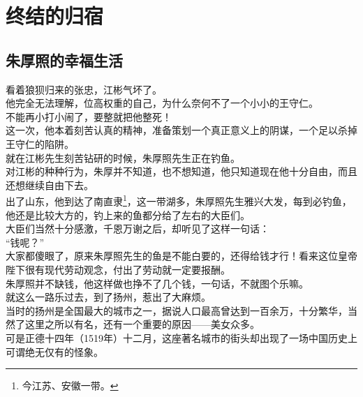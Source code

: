\section{终结的归宿}
\ifnum{}
	\begin{multicols}{\theparacolNo}
\fi
\subsection{朱厚照的幸福生活}
看着狼狈归来的张忠，江彬气坏了。\\

他完全无法理解，位高权重的自己，为什么奈何不了一个小小的王守仁。\\

不能再小打小闹了，要整就把他整死！\\

这一次，他本着刻苦认真的精神，准备策划一个真正意义上的阴谋，一个足以杀掉王守仁的陷阱。\\

就在江彬先生刻苦钻研的时候，朱厚照先生正在钓鱼。\\

对江彬的种种行为，朱厚并不知道，也不想知道，他只知道现在他十分自由，而且还想继续自由下去。\\

出了山东，他到达了南直隶\footnote{今江苏、安徽一带。}，这一带湖多，朱厚照先生雅兴大发，每到必钓鱼，他还是比较大方的，钓上来的鱼都分给了左右的大臣们。\\

大臣们当然十分感激，千恩万谢之后，却听见了这样一句话：\\

“钱呢？”\\

大家都傻眼了，原来朱厚照先生的鱼是不能白要的，还得给钱才行！看来这位皇帝陛下很有现代劳动观念，付出了劳动就一定要报酬。\\

朱厚照并不缺钱，他这样做也挣不了几个钱，一句话，不就图个乐嘛。\\

就这么一路乐过去，到了扬州，惹出了大麻烦。\\

当时的扬州是全国最大的城市之一，据说人口最高曾达到一百余万，十分繁华，当然了这里之所以有名，还有一个重要的原因——美女众多。\\

可是正德十四年（1519年）十二月，这座著名城市的街头却出现了一场中国历史上可谓绝无仅有的怪象。\\


\end{multicols}
